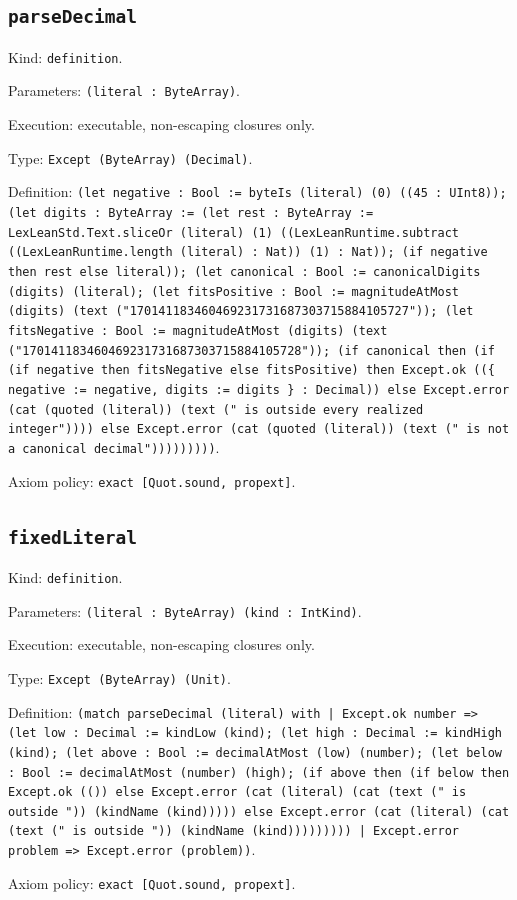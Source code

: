 \documentclass[11pt]{article}
\begin{document}
\subsection*{\texttt{parseDecimal}}
\noindent Kind: \texttt{definition}.\par
\noindent Parameters: \texttt{(literal : ByteArray)}.\par
\noindent Execution: executable, non-escaping closures only.\par
\noindent Type: \texttt{Except (ByteArray) (Decimal)}.\par
\noindent Definition: \texttt{(let negative : Bool := byteIs (literal) (0) ((45 : UInt8)); (let digits : ByteArray := (let rest : ByteArray := LexLeanStd.Text.sliceOr (literal) (1) ((LexLeanRuntime.subtract ((LexLeanRuntime.length (literal) : Nat)) (1) : Nat)); (if negative then rest else literal)); (let canonical : Bool := canonicalDigits (digits) (literal); (let fitsPositive : Bool := magnitudeAtMost (digits) (text ("170141183460469231731687303715884105727")); (let fitsNegative : Bool := magnitudeAtMost (digits) (text ("170141183460469231731687303715884105728")); (if canonical then (if (if negative then fitsNegative else fitsPositive) then Except.ok ((\{ negative := negative, digits := digits \} : Decimal)) else Except.error (cat (quoted (literal)) (text (" is outside every realized integer")))) else Except.error (cat (quoted (literal)) (text (" is not a canonical decimal")))))))))}.\par
\noindent Axiom policy: \texttt{exact [Quot.sound, propext]}.\par
\subsection*{\texttt{fixedLiteral}}
\noindent Kind: \texttt{definition}.\par
\noindent Parameters: \texttt{(literal : ByteArray) (kind : IntKind)}.\par
\noindent Execution: executable, non-escaping closures only.\par
\noindent Type: \texttt{Except (ByteArray) (Unit)}.\par
\noindent Definition: \texttt{(match parseDecimal (literal) with | Except.ok number => (let low : Decimal := kindLow (kind); (let high : Decimal := kindHigh (kind); (let above : Bool := decimalAtMost (low) (number); (let below : Bool := decimalAtMost (number) (high); (if above then (if below then Except.ok (()) else Except.error (cat (literal) (cat (text (" is outside ")) (kindName (kind))))) else Except.error (cat (literal) (cat (text (" is outside ")) (kindName (kind))))))))) | Except.error problem => Except.error (problem))}.\par
\noindent Axiom policy: \texttt{exact [Quot.sound, propext]}.\par
\end{document}
